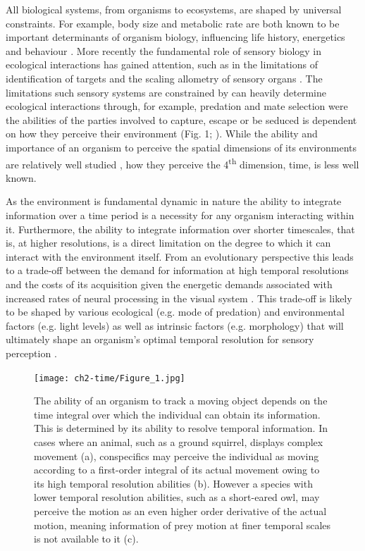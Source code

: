 All biological systems, from organisms to ecosystems, are shaped by universal constraints. For example, body size and metabolic rate are both known to be important determinants of organism biology, influencing life history, energetics and behaviour \citep{brown2004, woodward2005, sibly2012metabolic}. More recently the fundamental role of sensory biology in ecological interactions has gained attention, such as in the limitations of identification of targets \citep{tosh2010modelling} and the scaling allometry of sensory organs \citep{howland2004allometry,cronin2005role,garamszegi2002coevolving}. The limitations such sensory systems are constrained by can heavily determine ecological interactions through, for example, predation and mate selection were the abilities of the parties involved to capture, escape or be seduced is dependent on how they perceive their environment (Fig. 1; \citealt{cronin2005role,clark2012field,hornstein2000sexual,stevens2007predator}). While the ability and importance of an organism to perceive the spatial dimensions of its environments are relatively well studied \citep{cronin2005role,clark2012field}, how they perceive the 4\textsuperscript{th} dimension, time, is less well known.

As the environment is fundamental dynamic in nature the ability to integrate information over a time period is a necessity for any organism interacting within it. Furthermore, the ability to integrate information over shorter timescales, that is, at higher resolutions, is a direct limitation on the degree to which it can interact with the environment itself. From an evolutionary perspective this leads to a trade-off between the demand for information at high temporal resolutions and the costs of its acquisition given the energetic demands associated with increased rates of neural processing in the visual system \citep{laughlin2001energy}. This trade-off is likely to be shaped by various ecological (e.g. mode of predation) and environmental factors (e.g. light levels) as well as intrinsic factors (e.g. morphology) that will ultimately shape an organism's optimal temporal resolution for sensory perception \citep{autrum1958electrophysiological}.


\begin{figure}[h]
  \centering
  \texttt{[image: ch2-time/Figure\_1.jpg]}%
  \caption[Figure 1.]{ The ability of an organism to track a moving object depends on the time integral over which the individual can obtain its information. This is determined by its ability to resolve temporal information. In cases where an animal, such as a ground squirrel, displays complex movement (a), conspecifics may perceive the individual as moving according to a first-order integral of its actual movement owing to its high temporal resolution abilities (b). However a species with lower temporal resolution abilities, such as a short-eared owl, may perceive the motion as an even higher order derivative of the actual motion, meaning information of prey motion at finer temporal scales is not available to it (c).}
  \label{fig:Figure 1.}
\end{figure}


